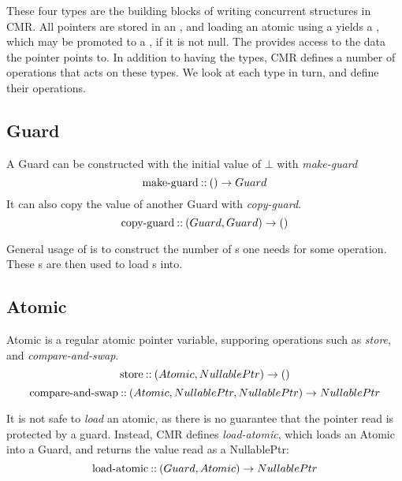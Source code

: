 These four types are the building blocks of writing concurrent structures in CMR\@. All pointers
are stored in an , and loading an atomic using a  yields a ,
which may be promoted to a , if it is not null. The  provides access to the data
the pointer points to.  In addition to having the types, CMR defines a number of operations that
acts on these types.  We look at each type in turn, and define their operations.

\subsection{Guard}
A Guard can be constructed with the initial value of $\bot$ with \emph{make-guard}
\begin{equation}\label{eq:make-guard}
  \text{make-guard\:::\:} () \to Guard
\end{equation}
It can also copy the value of another Guard with \emph{copy-guard}.
\begin{equation}\label{eq:copy-guard}
  \text{copy-guard\:::\:} (Guard, Guard) \to ()
\end{equation}

General usage of  is to construct the number of s one needs for some operation.
These s are then used to load s into.


\subsection{Atomic}

Atomic is a regular atomic pointer variable, supporing operations such as \emph{store}, and
\emph{compare-and-swap}.
\begin{equation}\label{eq:atomic-store}
  \text{store\:::\:} (Atomic, NullablePtr) \to ()
\end{equation}
\begin{equation}\label{eq:atomic-cas}
  \text{compare-and-swap\:::\:} (Atomic, NullablePtr, NullablePtr) \to NullablePtr
\end{equation}

It is not safe to \emph{load} an atomic, as there is no guarantee that the
pointer read is protected by a guard. Instead, CMR defines \emph{load-atomic}, which loads an
Atomic into a Guard, and returns the value read as a NullablePtr:
\begin{equation}\label{eq:load-atomic}
  \text{load-atomic\:::\:} (Guard, Atomic) \to NullablePtr
\end{equation}


